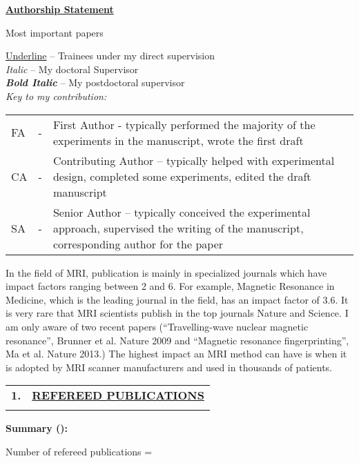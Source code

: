 \documentclass[11pt,notitlepage,english]{report}
\begin{document}
\noindent\textbf{\underline{Authorship Statement}}

\vspace{5pt}
\noindent* Most important papers 
\vspace{5pt}

\noindent\underline{Underline} – Trainees under my direct supervision \\
\textit{Italic} – My doctoral Supervisor\\
\textit{\textbf{Bold Italic}} – My postdoctoral supervisor\\

\noindent\textit{Key to my contribution:} \\
\begin{longtable}{ L{.4cm} L{.2cm}  L{15.2cm}  }
  FA & - & First Author - typically performed the majority of the experiments in the manuscript, wrote the first draft \\
  CA & - & Contributing Author – typically helped with experimental design, completed some experiments, edited the draft manuscript \\
  SA & - & Senior Author – typically conceived the experimental approach, supervised the writing of the manuscript, corresponding author for the paper\\
\end{longtable}

In the field of MRI, publication is mainly in specialized journals which have
impact factors ranging between 2 and 6. For example, Magnetic Resonance in
Medicine, which is the leading journal in the field, has an impact factor of
3.6. It is very rare that MRI scientists publish in the top journals Nature and
Science. I am only aware of two recent papers (“Travelling-wave nuclear
magnetic resonance”, Brunner et al. Nature 2009 and “Magnetic resonance
fingerprinting”, Ma et al. Nature 2013.) The highest impact an MRI method can
have is when it is adopted by MRI scanner manufacturers and used in thousands
of patients.

\begin{tabular}{L{.5cm} L{18.9cm} }
  \\
  \textbf{1.}  & \underline{\textbf{REFEREED PUBLICATIONS}}                                      \\
  \\
\end{tabular}

\textbf{Summary (\datecitationran):} 

\hspace{1cm} Number of refereed publications = \totalpapers %
\end{document}
